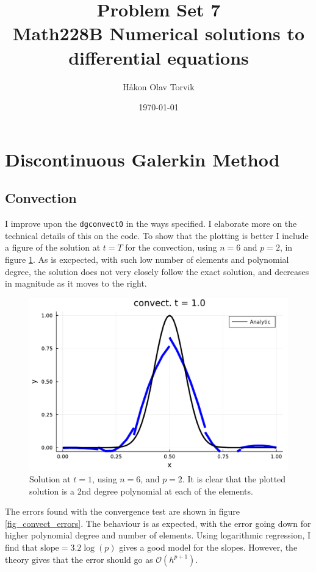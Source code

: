 \documentclass[aps, 12pt]{revtex4}
\begin{document}
\author{Håkon Olav Torvik}
\title{\Huge Problem Set 7 \\ \small Math228B Numerical solutions to differential equations}
\date{\today}


\maketitle

\section*{Discontinuous Galerkin Method}
\subsection*{Convection}
I improve upon the \texttt{dgconvect0} in the ways specified. I elaborate more on the technical details of this on the code. To show that the plotting is better I include a figure of the solution at $t=T$ for the convection, using $n=6$ and $p=2$, in figure \ref{fig_convect_final_u}. As is excpected, with such low number of elements and polynomial degree, the solution does not very closely follow the exact solution, and decreases in magnitude as it moves to the right.


\begin{figure}
    \includegraphics[width=0.75\linewidth]{u_finalconvect.pdf}
    \caption{Solution at $t=1$, using $n=6$, and $p=2$. It is clear that the plotted solution is a 2nd degree polynomial at each of the elements.}
    \label{fig_convect_final_u}
\end{figure}

The errors found with the convergence test are shown in figure \ref{fig_convect_errors}. The behaviour is as expected, with the error going down for higher polynomial degree and number of elements. Using logarithmic regression, I find that $\text{slope} = 3.2\log{(p)}$ gives a good model for the slopes. However, the theory gives that the error should go as $\mathcal{O}(h^{p+1})$.
\end{document}
